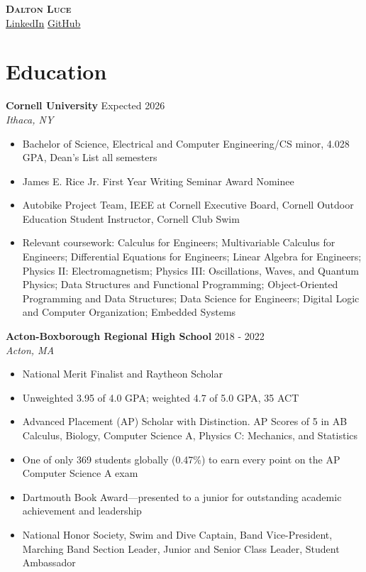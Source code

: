 \documentclass[letterpaper,8pt]{article}
\newcommand{\resumeEntry}[4]{
    \vspace{4pt}
    \large \textbf{#1}
    \normalsize \hfill #2
    \\
    \textit{#3} \hfill \textit{#4}
    \vspace{1pt}
}
\newcommand{\itemsBegin}{
    \begin{itemize}[leftmargin=0.2in, labelsep=0.05in, itemsep=0pt, parsep=1pt, topsep=0pt, partopsep=0pt]
}
\newcommand{\itemsEnd}{\end{itemize}}
\begin{document}
\textbf{\huge \scshape Dalton Luce} \\
\vspace{2pt}
\small
\addressConditional
\phoneConditional
\emailConditional
\href{https://www.linkedin.com/in/dalton-luce/}{\underline{LinkedIn}}
\hspace{10pt}
\href{https://github.com/da-luce}{\underline{GitHub}}
\vspace{-5pt}

\section{Education}

    \resumeEntry
        {Cornell University}
        {Expected 2026}
        {}
        {Ithaca, NY}

    \itemsBegin
        \item Bachelor of Science, Electrical and Computer Engineering/CS minor, 4.028 GPA, Dean’s List all semesters
        \item James E. Rice Jr. First Year Writing Seminar Award Nominee
        \item Autobike Project Team, IEEE at Cornell Executive Board, Cornell Outdoor Education Student Instructor, Cornell Club Swim
        \item Relevant coursework: Calculus for Engineers; Multivariable Calculus for Engineers; Differential Equations for Engineers; Linear Algebra for Engineers; Physics II: Electromagnetism; Physics III: Oscillations, Waves, and Quantum Physics; Data Structures and Functional Programming; Object-Oriented Programming and Data Structures; Data Science for Engineers; Digital Logic and Computer Organization; Embedded Systems
    \itemsEnd

    \resumeEntry
        {Acton-Boxborough Regional High School}
        {2018 - 2022}
        {}
        {Acton, MA}

    \itemsBegin
        \item National Merit Finalist and Raytheon Scholar
        \item Unweighted 3.95 of 4.0 GPA; weighted 4.7 of 5.0 GPA, 35 ACT
        \item Advanced Placement (AP) Scholar with Distinction. AP Scores of 5 in AB Calculus, Biology, Computer Science A, Physics C: Mechanics, and Statistics
        \item One of only 369 students globally (0.47\%) to earn every point on the AP Computer Science A exam
        \item Dartmouth Book Award—presented to a junior for outstanding academic achievement and leadership
        \item National Honor Society, Swim and Dive Captain, Band Vice-President, Marching Band Section Leader, Junior and Senior Class Leader, Student Ambassador
    \itemsEnd
\end{document}
